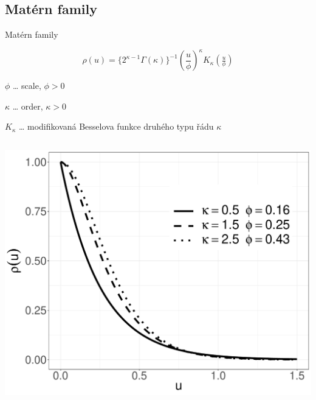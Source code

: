 \documentclass[
  ignorenonframetext,
]{beamer}
\begin{document}
\hypertarget{matuxe9rn-family}{%
\subsection{Matérn family}\label{matuxe9rn-family}}

\begin{frame}{Matérn family}
\large

\[\rho(u)=\{2^{\kappa-1}\Gamma(\kappa)\}^{-1}\left(\frac{u}{\phi}\right)^\kappa K_\kappa\left(\tfrac{u}{\phi}\right)\]

\small

\(\phi\) \ldots{} scale, \(\phi>0\)

\(\kappa\) \ldots{} order, \(\kappa>0\)

\(K_\kappa\) \ldots{} modifikovaná Besselova funkce druhého typu řádu
\(\kappa\)

\begin{columns}[T]
\begin{column}{0.5\textwidth}
\includegraphics{Lecture_1_files/figure-beamer/unnamed-chunk-23-1.pdf}
\end{column}


\end{columns}
\end{frame}
\end{document}
